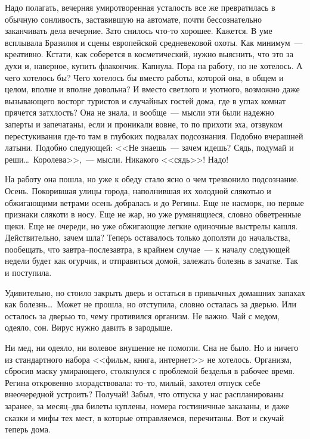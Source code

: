 Надо полагать, вечерняя умиротворенная усталость все же превратилась в обычную 
сонливость, заставившую на автомате, почти бессознательно заканчивать дела 
вечерние. Зато снилось что-то хорошее. Кажется. В уме всплывала Бразилия и сцены 
европейской средневековой охоты. Как минимум~--- креативно. Кстати, как 
соберется 
в косметический, нужно выяснить, что это за духи и, наверное, купить флакончик. 
Капнула. Пора на работу, но не хотелось. А чего хотелось бы? Чего хотелось бы 
вместо работы, которой она, в общем и целом, вполне и вполне довольна? И вместо 
светлого и уютного, возможно даже вызывающего восторг туристов и случайных 
гостей дома, где в углах комнат прячется затхлость? Она не знала, и вообще~--- 
мысли эти были надежно заперты и запечатаны, если и проникали вовне, то по 
прихоти эха, отзвуком перестукивания где-то там в глубоких подвалах подсознания. 
Подобно вчерашней латыни. Подобно следующей: <<Не знаешь~--- зачем идешь? Сядь, 
подумай и реши\ldots\ Королева>>,~--- мысли. Никакого <<сядь>>! Надо!

На работу она пошла, но уже к обеду стало ясно о чем трезвонило подсознание. 
Осень. Покорившая улицы города, наполнившая их холодной слякотью и обжигающими 
ветрами осень добралась и до Регины. Еще не насморк, но первые признаки слякоти 
в носу. Еще не жар, но уже румянящиеся, словно обветренные щеки. Еще не очереди, 
но уже обжигающие легкие одиночные выстрелы кашля. Действительно, зачем шла? 
Теперь оставалось только доползти до начальства, пообещать, что 
завтра--послезавтра, в крайнем случае~--- к началу следующей недели будет как 
огурчик, и отправиться домой, залежать болезнь в зачатке. Так и поступила.

Удивительно, но стоило закрыть дверь и остаться в привычных домашних запахах как 
болезнь\ldots\ Может не прошла, но отступила, словно осталась за дверью. Или осталось за дверью то, чему противился организм. Не важно. Чай с медом, одеяло, 
сон. Вирус нужно давить в зародыше. 

Ни мед, ни одеяло, ни волевое внушение не помогли. Сна не было. Но и ничего из 
стандартного набора <<фильм, книга, интернет>> не хотелось. Организм, сбросив 
маску умирающего, столкнулся с проблемой безделья в рабочее время. Регина 
откровенно злорадствовала: то--то, милый, захотел отпуск себе внеочередной 
устроить? Получай! Забыл, что отпуска у нас распланированы заранее, за месяц--два 
билеты куплены, номера гостиничные заказаны, и даже сказки и мифы тех мест, в 
которые отправляемся, перечитаны. Вот и скучай теперь дома.

